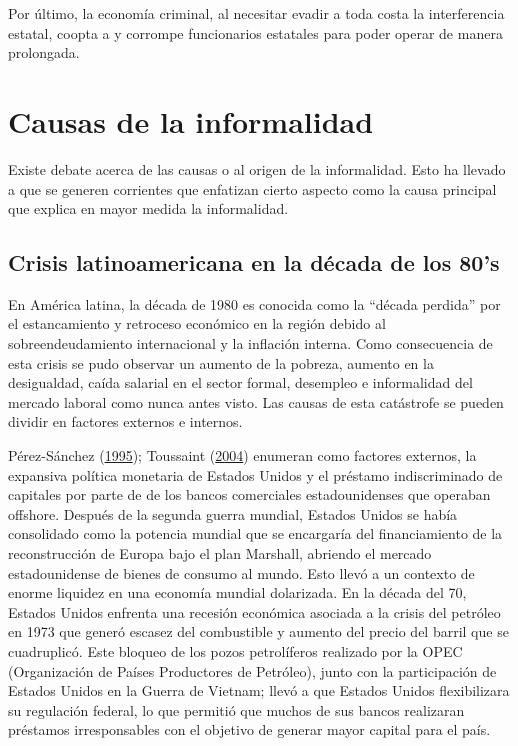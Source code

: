 \documentclass[
  letterpaper,
  12pt,
  oneside,
  spanish,
  doublespacing,
  headsepline,
  parskip]{MastersDoctoralThesis}
\begin{document}
Por último, la economía criminal, al necesitar evadir a toda costa la
interferencia estatal, coopta a y corrompe funcionarios estatales para
poder operar de manera prolongada.

\hypertarget{causas-de-la-informalidad}{%
\section{Causas de la informalidad}\label{causas-de-la-informalidad}}

Existe debate acerca de las causas o al origen de la informalidad. Esto
ha llevado a que se generen corrientes que enfatizan cierto aspecto como
la causa principal que explica en mayor medida la informalidad.

\hypertarget{crisis-latinoamericana-en-la-duxe9cada-de-los-80s}{%
\subsection{Crisis latinoamericana en la década de los
80's}\label{crisis-latinoamericana-en-la-duxe9cada-de-los-80s}}

En América latina, la década de 1980 es conocida como la ``década
perdida'' por el estancamiento y retroceso económico en la región debido
al sobreendeudamiento internacional y la inflación interna. Como
consecuencia de esta crisis se pudo observar un aumento de la pobreza,
aumento en la desigualdad, caída salarial en el sector formal, desempleo
e informalidad del mercado laboral como nunca antes visto. Las causas de
esta catástrofe se pueden dividir en factores externos e internos.

Pérez-Sánchez (\protect\hyperlink{ref-puxe9rez-suxe1nchez1995}{1995});
Toussaint (\protect\hyperlink{ref-toussaint2004}{2004}) enumeran como
factores externos, la expansiva política monetaria de Estados Unidos y
el préstamo indiscriminado de capitales por parte de de los bancos
comerciales estadounidenses que operaban offshore. Después de la segunda
guerra mundial, Estados Unidos se había consolidado como la potencia
mundial que se encargaría del financiamiento de la reconstrucción de
Europa bajo el plan Marshall, abriendo el mercado estadounidense de
bienes de consumo al mundo. Esto llevó a un contexto de enorme liquidez
en una economía mundial dolarizada. En la década del 70, Estados Unidos
enfrenta una recesión económica asociada a la crisis del petróleo en
1973 que generó escasez del combustible y aumento del precio del barril
que se cuadruplicó. Este bloqueo de los pozos petrolíferos realizado por
la OPEC (Organización de Países Productores de Petróleo), junto con la
participación de Estados Unidos en la Guerra de Vietnam; llevó a que
Estados Unidos flexibilizara su regulación federal, lo que permitió que
muchos de sus bancos realizaran préstamos irresponsables con el objetivo
de generar mayor capital para el país.
\end{document}
